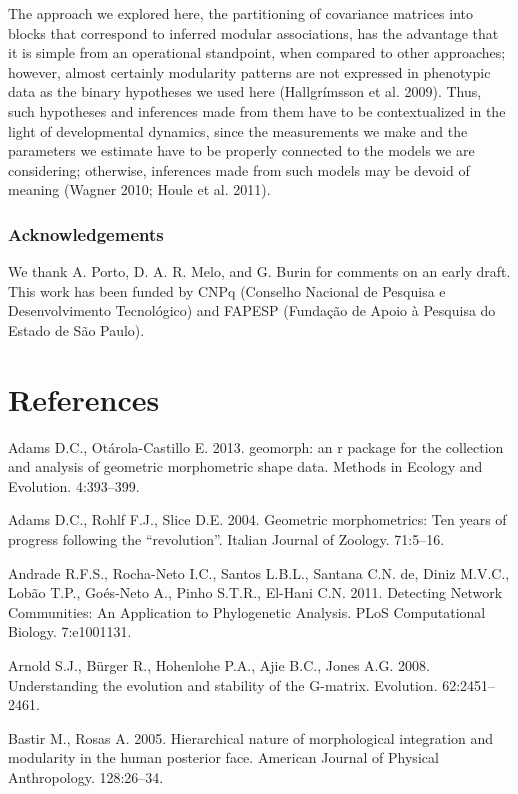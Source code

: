 \documentclass[12pt,]{article}
\begin{document}
The approach we explored here, the partitioning of covariance matrices
into blocks that correspond to inferred modular associations, has the
advantage that it is simple from an operational standpoint, when
compared to other approaches; however, almost certainly modularity
patterns are not expressed in phenotypic data as the binary hypotheses
we used here (Hallgrímsson et al. 2009). Thus, such hypotheses and
inferences made from them have to be contextualized in the light of
developmental dynamics, since the measurements we make and the
parameters we estimate have to be properly connected to the models we
are considering; otherwise, inferences made from such models may be
devoid of meaning (Wagner 2010; Houle et al. 2011).

\subsubsection{Acknowledgements}\label{acknowledgements}

We thank A. Porto, D. A. R. Melo, and G. Burin for comments on an early
draft. This work has been funded by CNPq (Conselho Nacional de Pesquisa
e Desenvolvimento Tecnológico) and FAPESP (Fundação de Apoio à Pesquisa
do Estado de São Paulo).

\section*{References}\label{references}

Adams D.C., Otárola-Castillo E. 2013. geomorph: an r package for the
collection and analysis of geometric morphometric shape data. Methods in
Ecology and Evolution. 4:393--399.

Adams D.C., Rohlf F.J., Slice D.E. 2004. Geometric morphometrics: Ten
years of progress following the ``revolution''. Italian Journal of
Zoology. 71:5--16.

Andrade R.F.S., Rocha-Neto I.C., Santos L.B.L., Santana C.N. de, Diniz
M.V.C., Lobão T.P., Goés-Neto A., Pinho S.T.R., El-Hani C.N. 2011.
Detecting Network Communities: An Application to Phylogenetic Analysis.
PLoS Computational Biology. 7:e1001131.

Arnold S.J., Bürger R., Hohenlohe P.A., Ajie B.C., Jones A.G. 2008.
Understanding the evolution and stability of the G-matrix. Evolution.
62:2451--2461.

Bastir M., Rosas A. 2005. Hierarchical nature of morphological
integration and modularity in the human posterior face. American Journal
of Physical Anthropology. 128:26--34.
\end{document}

